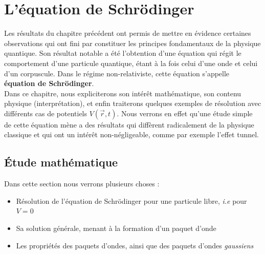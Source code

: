 
\chapter{L'équation de Schrödinger}\label{chap:chap3}
Les résultats du chapitre précédent ont permis de mettre en évidence certaines observations qui ont fini par constituer les principes fondamentaux de la physique quantique. Son résultat notable a été l'obtention d'une équation qui régit le comportement d'une particule quantique, étant à la fois celui d'une onde et celui d'un corpuscule. Dans le régime non-relativiste, cette équation s'appelle \textbf{équation de Schrödinger}. \\
Dans ce chapitre, nous expliciterons son intérêt mathématique, son contenu physique (interprétation), et enfin traiterons quelques exemples de résolution avec différents cas de potentiels $V(\vec{r},t)$. Nous verrons en effet qu'une étude simple de cette équation mène a des résultats qui diffèrent radicalement de la physique classique et qui ont un intérêt non-négligeable, comme par exemple l'effet tunnel. 


\section{Étude mathématique}
Dans cette section nous verrons plusieurs choses :
\begin{itemize}[label= \textbullet]
  \item Résolution de l'équation de Schrödinger pour une particule libre, \textit{i.e} pour $V = 0$
  \item Sa solution générale, menant à la formation d'un paquet d'onde
  \item Les propriétés des paquets d'ondes, ainsi que des paquets d'ondes \textit{gaussiens}
\end{itemize}
